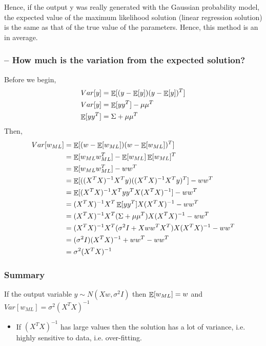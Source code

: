 \documentclass{article}
\begin{document}
Hence, if the output y was really generated with the Gaussian probability model, the expected value of the maximum likelihood solution (linear regression solution) is the same as that of the true value of the parameters. Hence, this method is an  in average.

\subsubsection{-- How much is the variation from the expected solution?}
Before we begin,
\begin{align*}
    Var[y] &= \operatorname*{\mathop{\mathbb{E}}}[(y-\operatorname*{\mathop{\mathbb{E}}}[y])(y-\operatorname*{\mathop{\mathbb{E}}}[y])^T]\\
    Var[y] & = \operatorname*{\mathop{\mathbb{E}}}[yy^T]-\mu\mu^T\\
    \operatorname*{\mathop{\mathbb{E}}}[yy^T] &= \Sigma + \mu\mu^T\\
\end{align*}
Then,
\begin{align*}
    Var[w_{ML}] &= \operatorname*{\mathop{\mathbb{E}}}[(w-\operatorname*{\mathop{\mathbb{E}}}[w_{ML}])(w-\operatorname*{\mathop{\mathbb{E}}}[w_{ML}])^T]\\
    & = \operatorname*{\mathop{\mathbb{E}}}[w_{ML}w_{ML}^T]-\operatorname*{\mathop{\mathbb{E}}}[w_{ML}]\operatorname*{\mathop{\mathbb{E}}}[w_{ML}]^T\\
    & = \operatorname*{\mathop{\mathbb{E}}}[w_{ML}w_{ML}^T]-ww^T\\
    & = \operatorname*{\mathop{\mathbb{E}}}[ ((X^TX)^{-1}X^Ty) ((X^TX)^{-1}X^Ty)^T]-ww^T\\
    & = \operatorname*{\mathop{\mathbb{E}}}[(X^TX)^{-1}X^Tyy^TX(X^TX)^{-1}]-ww^T\\
    & = (X^TX)^{-1}X^T \operatorname*{\mathop{\mathbb{E}}}[yy^T] X(X^TX)^{-1} - ww^T\\
    & = (X^TX)^{-1}X^T (\Sigma + \mu\mu^T)  X(X^TX)^{-1} - ww^T\\
    & = (X^TX)^{-1}X^T (\sigma^2I + Xww^TX^T)  X(X^TX)^{-1} - ww^T\\ 
    & = (\sigma^2I)(X^TX)^{-1} + ww^T - ww^T\\
    & = \sigma^2(X^TX)^{-1}\\
\end{align*}

\subsubsection{Summary}
If the output variable $y \sim N(Xw, \sigma^2I)$ then $\operatorname*{\mathop{\mathbb{E}}}[w_{ML}]=w$ and $Var[w_{ML}]=\sigma^2(X^TX)^{-1}$

\begin{itemize}
    \item If $(X^TX)^{-1}$ has large values then the solution has a lot of variance, i.e. highly sensitive to data, i.e. over-fitting.
\end{itemize}
\end{document}

